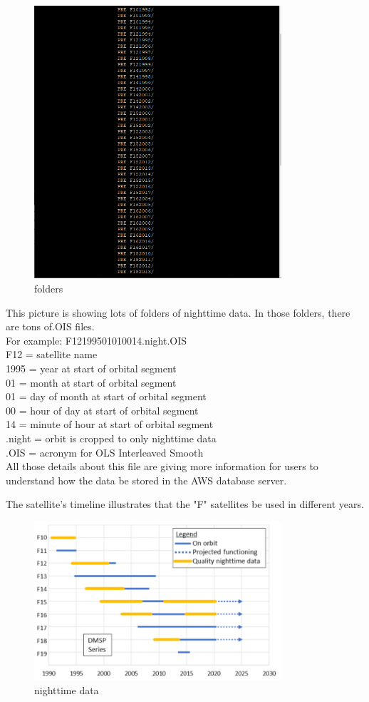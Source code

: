 \documentclass[conference]{IEEEtran}
\begin{document}
\begin{figure}[htbp]
    \centerline{\includegraphics[width=260pt]{images/2.png}}
    \caption{folders}
    \label{folders}
\end{figure}

	This picture is showing lots of folders of nighttime data.  In those folders, there are tons of.OIS files. 
	\\
	For example: F12199501010014.night.OIS \\
	F12 = satellite name \\
	1995 = year at start of orbital segment \\
	01 = month at start of orbital segment \\
	01 = day of month at start of orbital segment \\
	00 = hour of day at start of orbital segment \\
	14 = minute of hour at start of orbital segment \\
	.night = orbit is cropped to only nighttime data \\
	.OIS = acronym for OLS Interleaved Smooth \\
	
	All those details about this file are giving more information for users to understand how the data be stored in the AWS database server. 
	
	The satellite's timeline illustrates that the "F" satellites be used in different years.

\begin{figure}[htbp]
\centerline{\includegraphics[width=260pt]{images/2.1.png}}
\caption{nighttime data}
\label{nighttimedata}
\end{figure}
\end{document}
